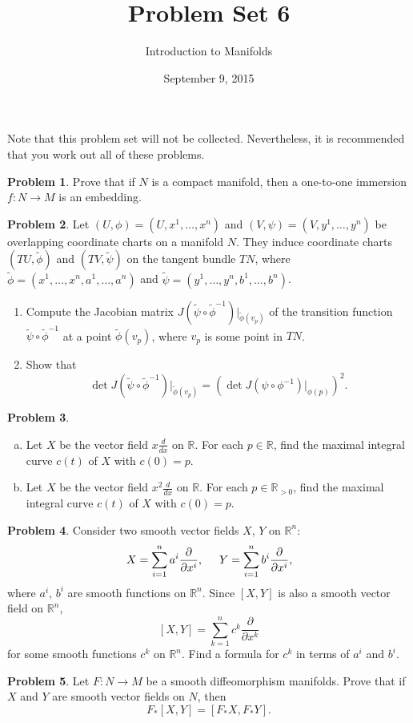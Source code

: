 \documentclass{amsart}
\newcommand{\+}[1]{\ensuremath{\mathbf{#1}}}
\newcommand{\R}{{\mathbb R}}
\theoremstyle{definition}
\newtheorem{prob}{Problem}
\begin{document}
\title{Problem Set 6}
\date{September 9, 2015}
\author{Introduction to Manifolds}

\maketitle

Note that this problem set will not be collected. 
Nevertheless, it is recommended that you
work out all of these problems.

\begin{prob}
Prove that if $N$ is a compact manifold,
then a one-to-one immersion
$f: N \to M$ is an embedding.
\end{prob}

\begin{prob}
Let $(U,\phi) = (U,x^1,\ldots,x^n)$ and
$(V, \psi) = (V, y^1, \ldots, y^n)$ be overlapping
coordinate charts on a manifold $N$.
They induce coordinate charts $(TU,\tilde{\phi})$
and $(TV,\tilde{\psi})$ on the tangent bundle $TN$,
where $\tilde{\phi} = (x^1,\ldots,x^n,a^1,\ldots,a^n)$ 
and   $\tilde{\psi} = (y^1,\ldots,y^n,b^1,\ldots,b^n)$. 
\begin{enumerate}
 \item Compute the Jacobian matrix 
 $J(\tilde{\psi} \circ \tilde{\phi}^{-1})|_{\tilde{\phi}(v_p)}$ 
 of the transition function $\tilde{\psi} \circ \tilde{\phi}^{-1}$ at 
 a point $\tilde{\phi}(v_p)$, where $v_p$ is some point in $TN$.
 \item Show that  
 \[\det J(\tilde{\psi} \circ \tilde{\phi}^{-1})|_{\tilde{\phi}(v_p)}
 = \left(\det J({\psi} \circ {\phi}^{-1})|_{{\phi}(p)}\right)^2.\]
\end{enumerate}
\end{prob}



\begin{prob}
\begin{enumerate}[(a)]
\item  Let $X$ be the vector field
 $x \frac{d}{dx}$ on $\R$.  For each $p \in \R$, find
 the maximal integral curve $c(t)$ of $X$ with $c(0)=p$.
 \item  Let $X$ be the vector field
 $x^2 \frac{d}{dx}$ on $\R$.  For each $p \in \R_{>0}$, find
 the maximal integral curve $c(t)$ of $X$ with $c(0)=p$.
\end{enumerate}
 \end{prob}


 \begin{prob}
Consider two smooth  vector fields $X$, $Y$ on $\R^n$:
\[
X = \sum^n_{i=1} a^i \frac{\partial}{\partial x^i},  \hspace{5mm}
Y = \sum^n_{i=1} b^i \frac{\partial}{\partial x^i},
\]
where $a^i$, $b^i$ are smooth functions on $\R^n$.
Since $[X,Y]$ is also a smooth vector field on $\R^n$,
\[
[X,Y] = \sum^n_{k=1} c^k \frac{\partial}{\partial x^k}
\]
for some smooth functions $c^k$ on $\R^n$.
Find a formula for $c^k$ in terms of $a^i$ and $b^i$.
 \end{prob}

 \begin{prob}
  Let $F:N \to M$ be a smooth diffeomorphism manifolds.
  Prove that if $X$ and $Y$ are smooth vector fields on $N$,
  then 
  \[
   F_*[X,Y] = [F_*X,F_*Y].
  \]
 \end{prob}

 
\end{document}

